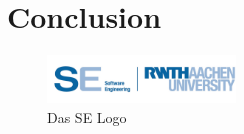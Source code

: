 \chapter{Conclusion}


\begin{figure}[ht!]
\begin{center}\includegraphics[width=5cm]{src/pic/logo}\end{center}
\caption{Das SE Logo}
\label{Logo}
\end{figure}

\cleardoublepage
